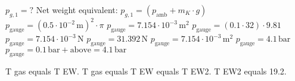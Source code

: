 \( p_{g,1} = ? \)  
Net weight equivalent:  
\( p_{g,1} = (p_{\text{amb}} + m_K \cdot g) \)  
\( p_{\text{gauge}} = (0.5 \cdot 10^{-2} \, \text{m})^2 \cdot \pi \)  
\( p_{\text{gauge}} = 7.154 \cdot 10^{-3} \, \text{m}^2 \)  
\( p_{\text{gauge}} = (0.1 \cdot 32) \cdot 9.81 \)  
\( p_{\text{gauge}} = 7.154 \cdot 10^{-3} \, \text{N} \)  
\( p_{\text{gauge}} = 31.392 \, \text{N} \)  
\( p_{\text{gauge}} = 7.154 \cdot 10^{-3} \, \text{m}^2 \)  
\( p_{\text{gauge}} = 4.1 \, \text{bar} \)  
\( p_{\text{gauge}} = 0.1 \, \text{bar} + \text{above} = 4.1 \, \text{bar} \)

T gas equals T EW.  
T gas equals T EW equals T EW2.  
T EW2 equals 19.2.